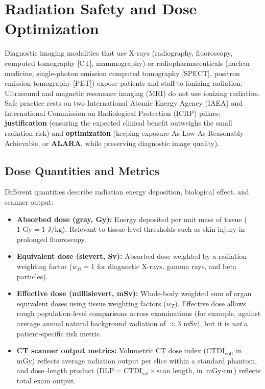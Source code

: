 \chapter{Radiation Safety and Dose Optimization}
\label{ch:radiation_safety}

Diagnostic imaging modalities that use X-rays (radiography, fluoroscopy, computed tomography [CT], mammography) or radiopharmaceuticals (nuclear medicine, single-photon emission computed tomography [SPECT], positron emission tomography [PET]) expose patients and staff to ionizing radiation. Ultrasound and magnetic resonance imaging (MRI) do not use ionizing radiation. Safe practice rests on two International Atomic Energy Agency (IAEA) and International Commission on Radiological Protection (ICRP) pillars: \textbf{justification} (ensuring the expected clinical benefit outweighs the small radiation risk) and \textbf{optimization} (keeping exposure As Low As Reasonably Achievable, or \textbf{ALARA}, while preserving diagnostic image quality).

\section{Dose Quantities and Metrics}
Different quantities describe radiation energy deposition, biological effect, and scanner output:
\begin{itemize}
    \item \textbf{Absorbed dose (gray, Gy):} Energy deposited per unit mass of tissue ($1\text{ Gy} = 1\text{ J/kg}$). Relevant to tissue-level thresholds such as skin injury in prolonged fluoroscopy.
    \item \textbf{Equivalent dose (sievert, Sv):} Absorbed dose weighted by a radiation weighting factor ($w_R = 1$ for diagnostic X-rays, gamma rays, and beta particles).
    \item \textbf{Effective dose (millisievert, mSv):} Whole-body weighted sum of organ equivalent doses using tissue weighting factors ($w_T$). Effective dose allows rough population-level comparisons across examinations (for example, against average annual natural background radiation of $\approx 3\text{ mSv}$), but it is \emph{not} a patient-specific risk metric.
    \item \textbf{CT scanner output metrics:} Volumetric CT dose index ($\text{CTDI}_{\text{vol}}$, in mGy) reflects average radiation output per slice within a standard phantom, and dose--length product ($\text{DLP} = \text{CTDI}_{\text{vol}} \times \text{scan length}$, in $\text{mGy}\cdot\text{cm}$) reflects total exam output.
\end{itemize}

